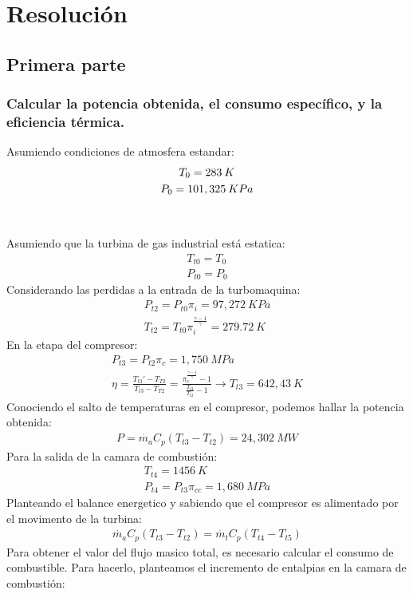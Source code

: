 \documentclass{report}
\begin{document}
\section{Resolución}
\subsection{Primera parte}
\subsubsection{Calcular la potencia obtenida, el consumo específico, y la eficiencia térmica.}
Asumiendo condiciones de atmosfera estandar:
\begin{gather}
  T_0 = 283\:K\\
  \vspace{1cm}
  P_0 = 101,325\:KPa
\end{gather}
Asumiendo que la turbina de gas industrial está estatica:
\begin{gather}
  T_{t0} = T_0\\
  P_{t0} = P_0
\end{gather}
Considerando las perdidas a la entrada de la turbomaquina:
\begin{gather}
  P_{t2} = P_{t0} \pi_i=97,272\:KPa\\
  T_{t2} = T_{t0} \pi_i^{\frac{\gamma-1}{\gamma}} = 279.72\:K
\end{gather}
En la etapa del compresor:
\begin{gather}
  P_{t3} = P_{t2} \pi_c=1,750\:MPa\\
  \eta = \frac{T_{t3}'-T_{T2}}{T_{t3}-T_{T2}}=\frac{\pi_c^\frac{\gamma-1}{\gamma}-1}{\frac{T_{t3}}{T_{t2}}-1}\xrightarrow{}T_{t3} = 642,43\:K
\end{gather}
Conociendo el salto de temperaturas en el compresor, podemos hallar la potencia obtenida:
\begin{gather}
  P=\Dot{m_a}C_p(T_{t3}-T_{t2})=\boxed{24,302\:MW}
\end{gather}
Para la salida de la camara de combustión:
\begin{gather}
  T_{t4} = 1456\:K\\
  P_{t4} = P_{t3} \pi_{cc}=1,680\:MPa
\end{gather}
Planteando el balance energetico y sabiendo que el compresor es alimentado por el movimento de la turbina: 
\begin{gather}
  \Dot{m_a}C_p(T_{t3}-T_{t2})=\Dot{m_t}C_p(T_{t4}-T_{t5})
\end{gather}
Para obtener el valor del flujo masico total, es necesario calcular el consumo de combustible. Para hacerlo, planteamos el incremento de entalpias en la camara de combustión:
\end{document}
